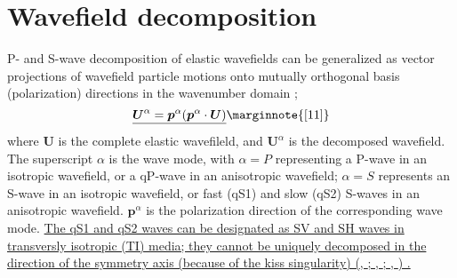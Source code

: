 \documentclass[manuscript,ulem,graphix,revised]{geophysics}
\begin{document}
\section {Wavefield decomposition}
\indent\indent
P- and S-wave decomposition of elastic wavefields can be generalized as vector projections of wavefield particle motions onto mutually orthogonal basis (polarization) directions in the wavenumber domain \citep{zhang10};
\begin{equation}
\uline{\boldsymbol{U}^\alpha=\boldsymbol{p}^\alpha(\boldsymbol{p}^\alpha\cdot\boldsymbol{U})} \marginnote{[11]}
\label{eqn:dec}
\end{equation}
where $\boldsymbol{U}$ is the complete elastic wavefileld, and ${\boldsymbol{U}}^\alpha$ is the decomposed wavefield. The superscript $\alpha$ is the wave mode, with $\alpha=P$ representing a P-wave in an isotropic wavefield, or a qP-wave in an anisotropic wavefield; $\alpha=S$ represents \marginnote{[39]} an S-wave in an isotropic wavefield, or fast (qS1) and slow (qS2) S-waves in an anisotropic wavefield. \marginnote{[11]} \uline{$\boldsymbol{p}^\alpha$} is the polarization direction of the corresponding wave mode. \marginnote{[10, 20, 21, 30, 31, 32, 36, 40]}
\uline{The qS1 and qS2 waves can be designated as SV and SH waves in transversly isotropic (TI) media; they cannot be uniquely decomposed in the direction of the symmetry axis (because of the kiss singularity)
(\mbox{\citeauthor{zhang10}}, \mbox{\citeyear{zhang10}}; 
\mbox{\citeauthor{Sripanich16}}, \mbox{\citeyear{Sripanich16}}; \mbox{\citeauthor{cheng16}}, \mbox{\citeyear{cheng16}})
.} 
\end{document}
